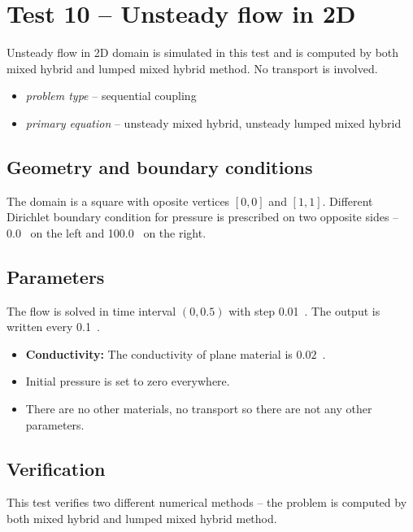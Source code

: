 
\section{Test 10 -- Unsteady flow in 2D}
\label{sec:test10}
Unsteady flow in 2D domain is simulated in this test and is computed by both mixed hybrid and 
lumped mixed hybrid method. No transport is involved. 

\begin{itemize} 
    \item \emph{problem type} -- sequential coupling
    \item \emph{primary equation} -- unsteady mixed hybrid, unsteady lumped mixed hybrid
  \end{itemize}

\subsection*{Geometry and boundary conditions}
The domain is a square with oposite vertices $[0,0]$ and $[1,1]$. Different Dirichlet boundary condition for 
pressure is prescribed on two opposite sides -- 0.0~ on the left and 100.0~ on the right.

\subsection*{Parameters}
The flow is solved in time interval $(0,0.5)$ with step 0.01~. The output is written every 0.1~.
\begin{itemize}
  \item \textbf{Conductivity:} The conductivity of plane material is $0.02$~.
  \item Initial pressure is set to zero everywhere.
  \item There are no other materials, no transport so there are not any other parameters.
\end{itemize}

\subsection*{Verification}
This test verifies two different numerical methods -- the problem is computed by both mixed hybrid and lumped mixed hybrid method.

